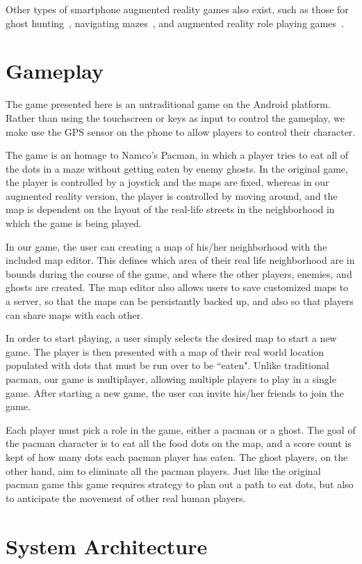 \documentclass{acm_proc_article-sp}
\begin{document}
Other types of smartphone augmented reality games also exist, such
as those for ghost hunting~\cite{SpecTrek}, navigating mazes~\cite{ARLabyrinth},
and augmented reality role playing games~\cite{ParallelKingdom}.


\section{Gameplay}
The game presented here is an untraditional game on the Android platform.
Rather than using the touchscreen or keys as input to control the gameplay,
we make use the GPS sensor on the phone to allow players to control their character.

The game is an homage to Namco's Pacman, in which a player tries to eat all
of the dots in a maze without getting eaten by enemy ghosts. In the original
game, the player is controlled by a joystick and the maps are fixed, whereas
in our augmented reality version, the player is controlled by moving around,
and the map is dependent on the layout of the real-life streets in the
neighborhood in which the game is being played.


In our game, the user can creating a map of his/her neighborhood with
the included map editor.
This defines which area of their real life neighborhood are in bounds during
the course of the game, and where the other players, enemies, and ghosts are
created.
The map editor also allows users to save customized maps to a server,
so that the maps can be persistantly backed up, and also so that players
can share maps with each other.

In order to start playing, a user simply selects the desired map to start a new game. The player is then presented with a map of their real world location populated with dots that must be run over to be ``eaten". Unlike traditional pacman, our game is multiplayer, allowing multiple players to play in a single game.
After starting a new game, the user can invite his/her friends to join the
game.

Each player must pick a role in the game, either a pacman or a ghost. The
goal of the pacman character is to eat all the food dots on the map, and
a score count is kept of how many dots each pacman player has eaten.
The ghost players, on the other hand, aim to eliminate all the pacman players.
Just like the original pacman game this game requires strategy to plan out a
path to eat dots, but also to anticipate the movement of other real human
players.

\section{System Architecture}
\end{document}
